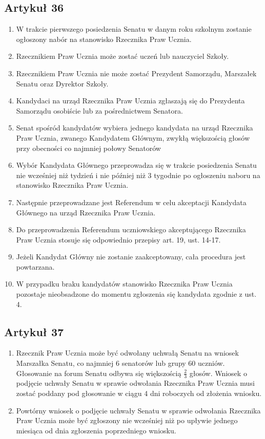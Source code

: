 \documentclass[14pt]{article}
\newenvironment{ustepy}{%
	\begin{enumerate}[leftmargin=1.5em, itemindent=1pt, labelwidth=1em, itemsep=5pt]
	}{%
	\end{enumerate}
}
\begin{document}
\subsection*{Artykuł 36}
\begin{ustepy}
	\item W trakcie pierwszego posiedzenia Senatu w danym roku szkolnym zostanie ogłoszony nabór na stanowisko Rzecznika Praw Ucznia.
	\item Rzecznikiem Praw Ucznia może zostać uczeń lub nauczyciel Szkoły.
	\item Rzecznikiem Praw Ucznia nie może zostać Prezydent Samorządu, Marszałek Senatu oraz Dyrektor Szkoły.
	\item Kandydaci na urząd Rzecznika Praw Ucznia zgłaszają się do Prezydenta  Samorządu osobiście lub za pośrednictwem Senatora.
	\item Senat spośród kandydatów wybiera jednego kandydata na urząd Rzecznika Praw Ucznia, zwanego Kandydatem Głównym, zwykłą większością głosów przy obecności co najmniej połowy Senatorów
	\item Wybór Kandydata Głównego przeprowadza się w trakcie posiedzenia Senatu nie wcześniej niż tydzień i nie później niż 3 tygodnie po ogłoszeniu naboru na stanowisko Rzecznika Praw Ucznia.
	\item Następnie przeprowadzane jest Referendum w celu akceptacji Kandydata Głównego na urząd Rzecznika Praw Ucznia.
	\item Do przeprowadzenia Referendum uczniowskiego akceptującego Rzecznika Praw Ucznia stosuje się odpowiednio przepisy art. 19, ust. 14-17.
	\item Jeżeli Kandydat Główny nie zostanie zaakceptowany, cała procedura jest powtarzana.
	\item W przypadku braku kandydatów stanowisko Rzecznika Praw Ucznia pozostaje nieobsadzone do momentu zgłoszenia się kandydata zgodnie z ust. 4. 
	\end{ustepy}
\subsection*{Artykuł 37}
\begin{ustepy}
	\item Rzecznik Praw Ucznia może być odwołany uchwałą Senatu na wniosek Marszałka Senatu, co najmniej 6 senatorów lub grupy 60 uczniów. Głosowanie na forum Senatu odbywa się większością \(\frac{2}{3}\) głosów. Wniosek o podjęcie uchwały Senatu w sprawie odwołania Rzecznika Praw Ucznia musi zostać poddany pod głosowanie w ciągu 4 dni roboczych od złożenia wniosku.
	\item Powtórny wniosek o podjęcie uchwały Senatu w sprawie odwołania Rzecznika Praw Ucznia może być zgłoszony nie wcześniej niż po upływie jednego miesiąca od dnia zgłoszenia poprzedniego wniosku.
\end{ustepy}
\end{document}
